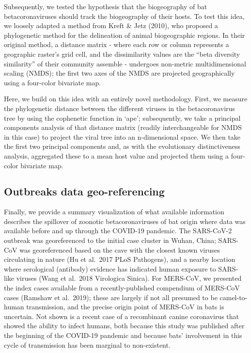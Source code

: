 \documentclass[11pt]{article}
\begin{document}
Subsequently, we tested the hypothesis that the biogeography of bat
betacoronaviruses should track the biogeography of their hosts. To test
this idea, we loosely adapted a method from Kreft \& Jetz (2010), who
proposed a phylogenetic method for the delineation of animal
biogeographic regions. In their original method, a distance matrix -
where each row or column represents a geographic raster's grid cell, and
the dissimilarity values are the ``beta diversity similarity'' of their
community assemble - undergoes non-metric multidimensional scaling
(NMDS); the first two axes of the NMDS are projected geographically
using a four-color bivariate map.

Here, we build on this idea with an entirely novel methodology. First,
we measure the phylogenetic distance between the different viruses in
the betacoronavirus tree by using the cophenetic function in `ape';
subsequently, we take a principal components analysis of that distance
matrix (readily interchangeable for NMDS in this case) to project the
viral tree into an n-dimensional space. We then take the first two
principal components and, as with the evolutionary distinctiveness
analysis, aggregated these to a mean host value and projected them using
a four-color bivariate map.

\hypertarget{outbreaks-data-geo-referencing}{%
\subsection{Outbreaks data
geo-referencing}\label{outbreaks-data-geo-referencing}}

Finally, we provide a summary visualization of what available
information describes the spillover of zoonotic betacoronaviruses of bat
origin where data was available before and up through the COVID-19
pandemic. The SARS-CoV-2 outbreak was georeferenced to the initial case
cluster in Wuhan, China; SARS-CoV was georeferenced based on the cave
with the closest known viruses circulating in nature (Hu et al.~2017
PLoS Pathogens), and a nearby location where serological (antibody)
evidence has indicated human exposure to SARS-like viruses (Wang et
al.~2018 Virologica Sinica). For MERS-CoV, we presented the index cases
available from a recently-published compendium of MERS-CoV cases
(Ramshaw et al.~2019); these are largely if not all presumed to be
camel-to-human transmission, and the precise origin point of MERS-CoV in
bats is uncertain. Not shown is a recent case of a recombinant canine
coronavirus that showed the ability to infect humans, both because this
study was published after the beginning of the COVID-19 pandemic and
because bats' involvement in this cycle of transmission has been
marginal to non-existent.
\end{document}
